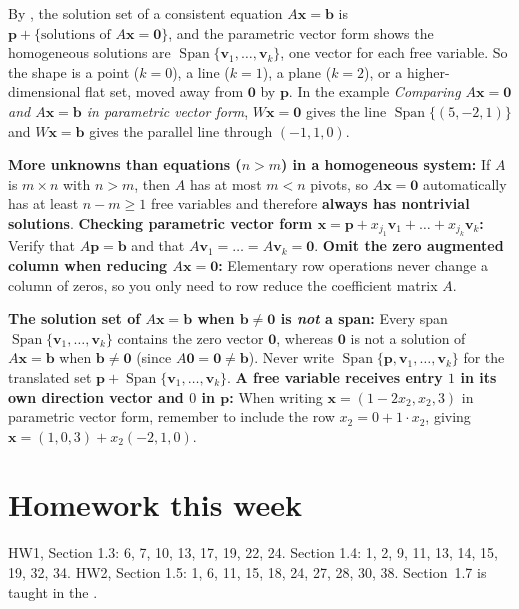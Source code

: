 \documentclass[10pt]{scrartcl}
\newcommand{\vv}[1]{\mathbf{#1}}
\DeclareMathOperator{\spn}{Span}
\begin{document}
\revisit
By , the solution set of a consistent equation $A\vv x=\vv b$ is $\vv p+\{\text{solutions of }A\vv x=\vv 0\}$, and the parametric vector form shows the homogeneous solutions are $\spn\{\vv v_1,\dots,\vv v_k\}$, one vector for each free variable. So the shape is a point ($k=0$), a line ($k=1$), a plane ($k=2$), or a higher-dimensional flat set, moved away from $\vv 0$ by $\vv p$. In the example \emph{Comparing $A\vv x=\vv 0$ and $A\vv x=\vv b$ in parametric vector form}, $W\vv x=\vv 0$ gives the line $\spn\{(5,-2,1)\}$ and $W\vv x=\vv b$ gives the parallel line through $(-1,1,0)$.

\begin{shortcuts}
  \ii \textbf{More unknowns than equations ($n>m$) in a homogeneous system:} If $A$ is $m\times n$ with $n>m$, then $A$ has at most $m<n$ pivots, so $A\vv x=\vv 0$ automatically has at least $n-m\ge 1$ free variables and therefore \textbf{always has nontrivial solutions}.
  \ii \textbf{Checking parametric vector form $\vv x=\vv p+x_{j_1}\vv v_1+\dots+x_{j_k}\vv v_k$:} Verify that $A\vv p=\vv b$ and that $A\vv v_1=\dots=A\vv v_k=\vv 0$.
  \ii \textbf{Omit the zero augmented column when reducing $A\vv x=\vv 0$:} Elementary row operations never change a column of zeros, so you only need to row reduce the coefficient matrix $A$.
\end{shortcuts}

\begin{trapbox}
  \ii \textbf{The solution set of $A\vv x=\vv b$ when $\vv b\ne\vv 0$ is \emph{not} a span:} Every span $\spn\{\vv v_1,\dots,\vv v_k\}$ contains the zero vector $\vv 0$, whereas $\vv 0$ is not a solution of $A\vv x=\vv b$ when $\vv b\ne\vv 0$ (since $A\vv 0=\vv 0\ne\vv b$). Never write $\spn\{\vv p,\vv v_1,\dots,\vv v_k\}$ for the translated set $\vv p+\spn\{\vv v_1,\dots,\vv v_k\}$.
  \ii \textbf{A free variable receives entry $1$ in its own direction vector and $0$ in $\vv p$:} When writing $\vv x=(1-2x_2,x_2,3)$ in parametric vector form, remember to include the row $x_2=0+1\cdot x_2$, giving $\vv x=(1,0,3)+x_2(-2,1,0)$.
\end{trapbox}

\section{Homework this week}
HW1, Section 1.3: 6, 7, 10, 13, 17, 19, 22, 24. Section 1.4: 1, 2, 9, 11, 13, 14, 15, 19, 32, 34. HW2, Section 1.5: 1, 6, 11, 15, 18, 24, 27, 28, 30, 38. Section~1.7 is taught in the .
\end{document}
